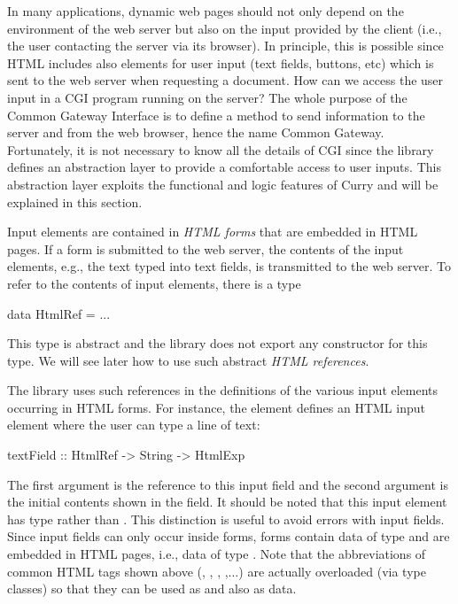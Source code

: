 In many applications, dynamic web pages should not only depend
on the environment of the web server but also on the input
provided by the client (i.e., the user contacting the server
via its browser). In principle, this is possible since
HTML includes also elements for user input (text fields, buttons, etc)
which is sent to the web server when requesting a document.
How can we access the user input in a CGI program running on
the server?
The whole purpose of the Common Gateway Interface is to define
a method to send information to the server and from the web browser,
hence the name Common Gateway.
Fortunately, it is not necessary to know all the details of
CGI since the library  defines an abstraction layer
to provide a comfortable access to user inputs.
This abstraction layer exploits the functional and logic features
of Curry and will be explained in this section.

Input elements are contained in \emph{HTML forms}
that are embedded in HTML pages.
If a form is submitted to the web server, the contents
of the input elements, e.g., the text typed into text fields,
is transmitted to the web server.
To refer to the contents of input elements, there is a type
%
\begin{curry}
data HtmlRef = ...
\end{curry}
%
This type is abstract and the library 
does not export any constructor for this type.
We will see later how to use such abstract
\emph{HTML references}.

The library  uses such references
in the definitions of the various input elements occurring in HTML forms.
For instance, the element  defines
an HTML input element where the user can type a line of text:
%
\begin{curry}
textField :: HtmlRef -> String -> HtmlExp
\end{curry}
%
The first argument is the reference to this input field and
the second argument is the initial contents shown in the field.
It should be noted that this input element has type
 rather than .
This distinction is useful to avoid errors with input fields.
Since input fields can only occur inside forms,
forms contain data of type  and are embedded
in HTML pages, i.e., data of type .
Note that the abbreviations of common HTML tags shown above
(, , , ,$\ldots$)
are actually overloaded (via type classes)
so that they can be used as  and also as  data.

